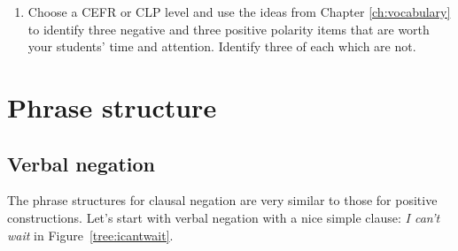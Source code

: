 \begin{tcolorbox}[title=Negative auxiliary verbs, colback=white]
\begin{enumerate}[noitemsep]
    \item Choose a CEFR or CLP level and use the ideas from Chapter \ref{ch:vocabulary} to identify three negative and three positive polarity items that are worth your students' time and attention. Identify three of each which are not.
\end{enumerate}
\end{tcolorbox}

\section{Phrase structure}

\subsection{Verbal negation}

The phrase structures for clausal negation are very similar to those for positive constructions. Let's start with verbal negation with a nice simple clause: \textit{I can't wait} in Figure~\ref{tree:icantwait}.

